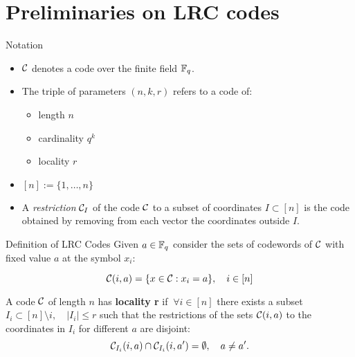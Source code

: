 \section{Preliminaries on LRC codes}

\begin{frame}{Notation}
    \begin{itemize}

	    \item $\mathcal{C}$ denotes a code over the finite field $\mathbb{F}_q$.
	    
	    \item The triple of parameters $(n,k,r)$ refers to a code of:
	    \begin{itemize}
	        \item length $n$
	        \item cardinality $q^k$
	        \item locality $r$
	    \end{itemize}
	    
	    \item $[n] := \{ 1, \dots , n\}$
	    
	    \item A \textit{restriction} $\mathcal{C}_I$ of the code $\mathcal{C}$ to a subset of coordinates $I \subset [n]$ is the code obtained by removing from each vector the coordinates outside $I$.
    \end{itemize}
\end{frame}


\begin{frame}{Definition of LRC Codes}
    Given $a \in \mathbb{F}_q$ consider the sets of codewords of $\mathcal{C}$ with fixed value $a$ at the symbol $x_i$:

    $$ \mathcal{C} (i,a) = \{ x \in \mathcal{C} : x_i = a \}, \quad i \in [n] $$
    
    \begin{defn}
        A code $\mathcal{C}$ of length $n$ has \textbf{locality r} if $\ \forall i \in [n ] $ there exists a subset $I_i \subset [n] \setminus i, \quad \vert I_i \vert \leq r$ such that the restrictions of the sets $\mathcal{C} (i,a)$ to the coordinates in $I_i$ for different $a$ are disjoint:
        $$\mathcal{C}_{I_i} (i,a) \cap \mathcal{C}_{I_i} (i,a') = \emptyset, \quad a \neq a'.$$
    \end{defn}    
\end{frame}

    

